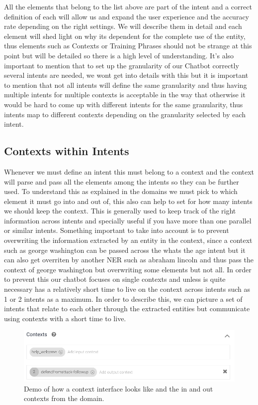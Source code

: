 All the elements that belong to the list above are part of the intent and a correct definition of each will allow us and expand the user experience and the accuracy rate depending on the right settings. We will describe them in detail and each element will shed light on why its dependent for the complete use of the entity, thus elements such as Contexts or Training Phrases should not be strange at this point but will be detailed so there is a high level of understanding. It's also important to mention that to set up the granularity of our Chatbot correctly several intents are needed, we wont get into details with this but it is important to mention that not all intents will define the same granularity and thus having multiple intents for multiple contexts is acceptable in the way that otherwise it would be hard to come up with different intents for the same granularity, thus intents map to different contexts depending on the granularity selected by each intent.

\subsection{Contexts within Intents}
Whenever we must define an intent this must belong to a context and the context will parse and pass all the elements among the intents so they can be further used. To understand this as explained in the domains we must pick to which element it must go into and out of, this also can help to set for how many intents we should keep the context. This is generally used to keep track of the right information across intents and specially useful if you have more than one parallel or similar intents. Something important to take into account is to prevent overwriting the information extracted by an entity in the context, since a context such as george washington can be passed across the whats the age intent but it can also get overriten by another NER such as abraham lincoln and thus pass the context of george washington but overwriting some elements but not all. In order to prevent this our chatbot focuses on single contexts and unless is quite necessary has a relatively short time to live on the context across intents such as 1 or 2 intents as a maximum. In order to describe this, we can picture a set of intents that relate to each other through the extracted entities but communicate using contexts with a short time to live.

\begin{figure}[!ht]
    \centering
    \includegraphics[scale=0.65]{MA-BA-Thesis/Contextsdemo.png}
    \caption{Demo of how a context interface looks like and the in and out contexts from the domain.}
    \label{fig:contextDemo}
\end{figure}

